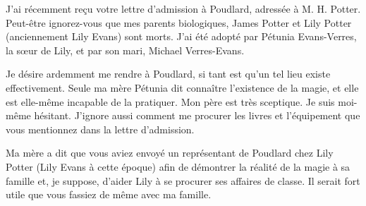 \filbreak
\begin{writtenNote}


J'ai récemment reçu votre lettre d'admission à Poudlard, adressée à M. H. Potter. Peut-être ignorez-vous que mes parents biologiques, James Potter et Lily Potter (anciennement Lily Evans) sont morts. J'ai été adopté par Pétunia Evans-Verres, la sœur de Lily, et par son mari, Michael Verres-Evans.

Je désire ardemment me rendre à Poudlard, si tant est qu'un tel lieu existe effectivement. Seule ma mère Pétunia dit connaître l'existence de la magie, et elle est elle-même incapable de la pratiquer. Mon père est très sceptique. Je suis moi-même hésitant. J'ignore aussi comment me procurer les livres et l'équipement que vous mentionnez dans la lettre d'admission.

Ma mère a dit que vous aviez envoyé un représentant de Poudlard chez Lily Potter (Lily Evans à cette époque) afin de démontrer la réalité de la magie à sa famille et, je suppose, d'aider Lily à se procurer ses affaires de classe. Il serait fort utile que vous fassiez de même avec ma famille.

\end{writtenNote}

